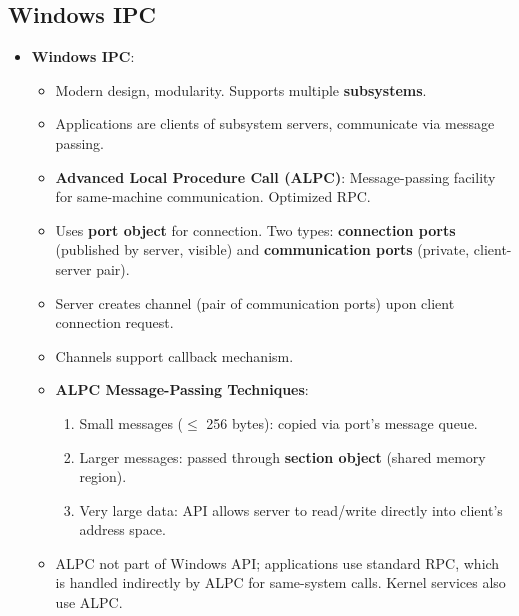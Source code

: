 \subsection{Windows IPC}
\begin{itemize}
    \item \textbf{Windows IPC}:
        \begin{itemize}
            \item Modern design, modularity. Supports multiple \textbf{subsystems}.
            \item Applications are clients of subsystem servers, communicate via message passing.
            \item \textbf{Advanced Local Procedure Call (ALPC)}: Message-passing facility for same-machine communication. Optimized RPC.
            \item Uses \textbf{port object} for connection. Two types: \textbf{connection ports} (published by server, visible) and \textbf{communication ports} (private, client-server pair).
            \item Server creates channel (pair of communication ports) upon client connection request.
            \item Channels support callback mechanism.
            \item \textbf{ALPC Message-Passing Techniques}:
                \begin{enumerate}
                    \item Small messages ($\le$ 256 bytes): copied via port's message queue.
                    \item Larger messages: passed through \textbf{section object} (shared memory region).
                    \item Very large data: API allows server to read/write directly into client's address space.
                \end{enumerate}
            \item ALPC not part of Windows API; applications use standard RPC, which is handled indirectly by ALPC for same-system calls. Kernel services also use ALPC.
        \end{itemize}
\end{itemize}

